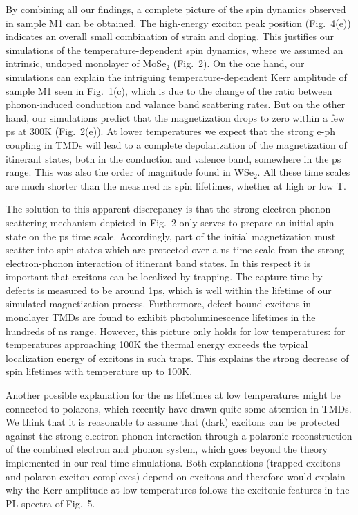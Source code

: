 \documentclass[prb,aps,superscriptaddress,reprint]{revtex4-1}
\begin{document}
By combining all our findings, a complete picture of the spin dynamics observed in sample M1 can be obtained. The high-energy exciton peak position (Fig.~4(e)) indicates an overall small combination of strain and doping. This justifies our simulations of the temperature-dependent spin dynamics, where we assumed an intrinsic, undoped monolayer of MoSe$_2$ (Fig.~2). 
On the one hand, our simulations can explain the intriguing temperature-dependent Kerr amplitude of sample M1 seen in Fig.~1(c), which is due to the change of the ratio between phonon-induced conduction and valance band scattering rates. 
But on the other hand, our simulations predict that the magnetization drops to zero within a few ps at \unit{300}{K} (Fig.~2(e)). At lower temperatures we expect that the strong e-ph coupling in TMDs\cite{NanoLetters.17.4549, PRL.119.187402, NatureComm.8.14670, npj2DMaterialsandApplications.1.33, PRB.98.035302} will lead to a complete depolarization of the magnetization of itinerant states, both in the conduction and valence band, somewhere in the ps range. This was also the order of magnitude found in WSe$_2$.\cite{NanoLetters.17.4549} All these time scales are much shorter than the measured ns spin lifetimes, whether at high or low T.

The solution to this apparent discrepancy is that the strong electron-phonon scattering mechanism depicted in Fig.~2 only serves to prepare an initial spin state on the ps time scale. Accordingly, part of the initial magnetization must scatter into spin states which are protected over a ns time scale from the strong electron-phonon interaction of itinerant band states. In this respect it is important that excitons can be localized by trapping.\cite{PhysRevB.94.165301, PhysRevB.96.121404} The capture time by defects is measured to be around \unit{1}{ps},\cite{npj2DMaterialsandApplications.1.15} which is well within the lifetime of our simulated magnetization process. Furthermore, defect-bound excitons in monolayer TMDs are found to exhibit photoluminescence lifetimes in the hundreds of ns range.\cite{PhysRevB.96.121404, PhysRevLett.121.057403} However, this picture only holds for low temperatures: for temperatures approaching \unit{100}{K} the thermal energy exceeds the typical localization energy of excitons in such traps.\cite{PhysRevB.94.165301, APL.105.101901} This explains the  strong decrease of spin lifetimes with temperature up to \unit{100}{K}.

Another possible explanation for the ns lifetimes at low temperatures might be connected to polarons, which recently have drawn quite some attention in TMDs.\cite{NaturePhysics.13.255,PhysRevLett.114.146404,PRL.119.187402,PhysRevB.95.035417,JournalofAppliedPhysics.123.204308,JournalofAppliedPhysics.123.214303} We think that it is reasonable to assume that (dark) excitons\cite{PhysicalReviewMaterials.2.014002} can be protected against the strong electron-phonon interaction through a polaronic reconstruction of the combined electron and phonon system, which goes beyond the theory implemented in our real time simulations. Both explanations (trapped excitons and polaron-exciton complexes) depend on excitons and therefore would explain why the Kerr amplitude at low temperatures follows the excitonic features in the PL spectra of Fig.~5.
\end{document}
